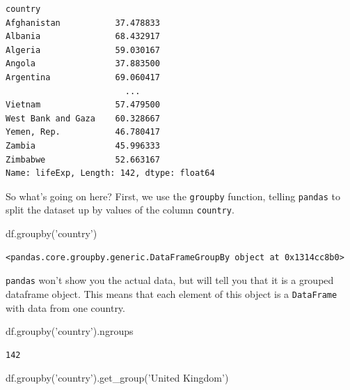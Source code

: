 \documentclass[
  letterpaper,
]{scrbook}
\newenvironment{Shaded}{\begin{snugshade}}{\end{snugshade}}
\newcommand{\NormalTok}[1]{#1}
\newcommand{\StringTok}[1]{\textcolor[rgb]{0.31,0.60,0.02}{#1}}
\begin{document}
\begin{verbatim}
country
Afghanistan           37.478833
Albania               68.432917
Algeria               59.030167
Angola                37.883500
Argentina             69.060417
                        ...    
Vietnam               57.479500
West Bank and Gaza    60.328667
Yemen, Rep.           46.780417
Zambia                45.996333
Zimbabwe              52.663167
Name: lifeExp, Length: 142, dtype: float64
\end{verbatim}

So what's going on here? First, we use the \texttt{groupby} function, telling \texttt{pandas} to split the dataset up by values of the column \texttt{country}.

\begin{Shaded}
\begin{Highlighting}[]
\NormalTok{df.groupby(}\StringTok{'country'}\NormalTok{)}
\end{Highlighting}
\end{Shaded}

\begin{verbatim}
<pandas.core.groupby.generic.DataFrameGroupBy object at 0x1314cc8b0>
\end{verbatim}

\texttt{pandas} won't show you the actual data, but will tell you that it is a grouped dataframe object. This means that each element of this object is a \texttt{DataFrame} with data from one country.

\begin{Shaded}
\begin{Highlighting}[]
\NormalTok{df.groupby(}\StringTok{'country'}\NormalTok{).ngroups}
\end{Highlighting}
\end{Shaded}

\begin{verbatim}
142
\end{verbatim}

\begin{Shaded}
\begin{Highlighting}[]
\NormalTok{df.groupby(}\StringTok{'country'}\NormalTok{).get_group(}\StringTok{'United Kingdom'}\NormalTok{)}
\end{Highlighting}
\end{Shaded}
\end{document}
